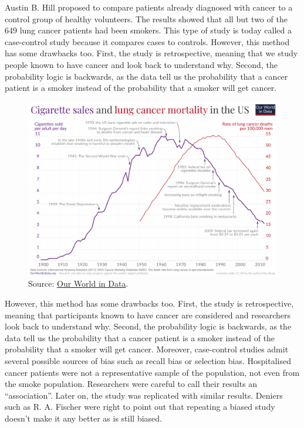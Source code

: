 \documentclass[
]{book}
\begin{document}
Austin B. Hill proposed to compare patients already diagnosed with cancer to a control group of healthy volunteers. The results showed that all but two of the 649 lung cancer patients had been smokers. This type of study is today called a case-control study because it compares cases to controls. However, this method has some drawbacks too. First, the study is retrospective, meaning that we study people known to have cancer and look back to understand why. Second, the probability logic is backwards, as the data tell us the probability that a cancer patient is a smoker instead of the probability that a smoker will get cancer.



\begin{figure}

{\centering \includegraphics[width=0.75\linewidth]{Figures/Smoking-and-lung-cancer-mortality-US-only} 

}

\caption{Source: \href{https://ourworldindata.org/smoking-big-problem-in-brief}{Our World in Data}.}\label{fig:smoke-ts}
\end{figure}

However, this method has some drawbacks too. First, the study is retrospective, meaning that participants known to have cancer are considered and researchers look back to understand why. Second, the probability logic is backwards, as the data tell us the probability that a cancer patient is a smoker instead of the probability that a smoker will get cancer. Moreover, case-control studies admit several possible sources of bias such as recall bias or selection bias. Hospitalised cancer patients were not a representative sample of the population, not even from the smoke population. Researchers were careful to call their results an ``association''. Later on, the study was replicated with similar results. Deniers such as R. A. Fischer were right to point out that repeating a biased study doesn't make it any better as is still biased.
\end{document}
